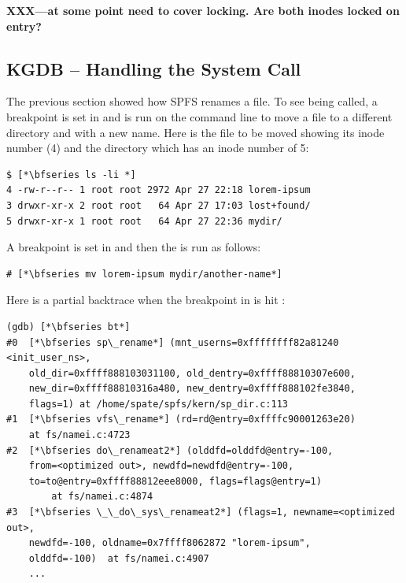 \noindent
\textbf{XXX---at some point need to cover locking. Are both inodes locked on entry?}


\subsection{KGDB -- Handling the  System Call}

The previous section showed how SPFS renames a file. To see  being called, a breakpoint is set in  and  is run on the command line to move a file to a different directory and with a new name. Here is the file to be moved showing its inode number (4) and the directory which has an inode number of 5:

\begin{lstlisting}
$ [*\bfseries ls -li *]
4 -rw-r--r-- 1 root root 2972 Apr 27 22:18 lorem-ipsum
3 drwxr-xr-x 2 root root   64 Apr 27 17:03 lost+found/
5 drwxr-xr-x 1 root root   64 Apr 27 22:36 mydir/
\end{lstlisting}

\noindent
A breakpoint is set in  and then the  is run as follows:

\begin{lstlisting}
# [*\bfseries mv lorem-ipsum mydir/another-name*]
\end{lstlisting}

\noindent
Here is a partial backtrace when the breakpoint in  is hit :

\begin{lstlisting}
(gdb) [*\bfseries bt*]
#0  [*\bfseries sp\_rename*] (mnt_userns=0xffffffff82a81240 <init_user_ns>, 
    old_dir=0xffff888103031100, old_dentry=0xffff88810307e600, 
    new_dir=0xffff88810316a480, new_dentry=0xffff888102fe3840, 
    flags=1) at /home/spate/spfs/kern/sp_dir.c:113
#1  [*\bfseries vfs\_rename*] (rd=rd@entry=0xffffc90001263e20) 
    at fs/namei.c:4723
#2  [*\bfseries do\_renameat2*] (olddfd=olddfd@entry=-100, 
    from=<optimized out>, newdfd=newdfd@entry=-100, 
    to=to@entry=0xffff88812eee8000, flags=flags@entry=1) 
        at fs/namei.c:4874
#3  [*\bfseries \_\_do\_sys\_renameat2*] (flags=1, newname=<optimized out>, 
    newdfd=-100, oldname=0x7ffff8062872 "lorem-ipsum", 
    olddfd=-100)  at fs/namei.c:4907
    ...
\end{lstlisting}

